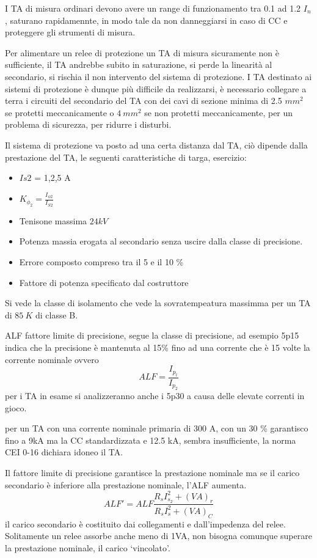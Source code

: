 I TA di misura ordinari devono avere un range di funzionamento tra 0.1 ad 1.2 $I_n$, saturano rapidamennte, in modo tale da non danneggiarsi in caso di CC e proteggere gli strumenti di misura.

Per alimentare un relee di protezione un TA di misura sicuramente non è sufficiente, il TA andrebbe subito in saturazione, si perde la linearità al secondario, si rischia il non intervento del sistema di protezione.
I TA destinato ai sistemi di protezione è dunque più difficile da realizzarsi, è necessario collegare a terra i circuiti del secondario del TA con dei cavi di sezione minima di 2.5 $mm^2$ se protetti meccanicamente o $4\ mm^2$ se non protetti meccanicamente, per un problema di sicurezza, per ridurre i disturbi.

Il sistema di protezione va posto ad una certa distanza dal TA, ciò dipende dalla prestazione del TA, le seguenti caratteristiche di targa, esercizio:
\begin{itemize}
    \item $Is2$ = 1,2,5 A
    \item $K_{\phi_2} = \frac{I_{\phi 2}}{I_{S2}}$
    \item Tenisone massima $24 kV$
    \item Potenza massia erogata al secondario senza uscire dalla classe di precisione.
    \item Errore composto compreso tra il 5 e il 10 \%
    \item Fattore di potenza specificato dal costruttore
\end{itemize}
Si vede la classe di isolamento che vede la sovratempeatura massimma per un TA di $ 85 \ K$ di classe B. 


ALF fattore limite di precisione, segue la classe di precisione, ad esempio 5p15 indica che la precisione è mantenuta al 15\% fino ad una corrente che è 15 volte la corrente nominale ovvero
$$
ALF = \frac{I_{p_l}}{I_{p_2}}
$$
per i TA in esame si analizzeranno anche i 5p30 a causa delle elevate correnti in gioco.

per un TA con una corrente nominale primaria di 300 A, con un 30 \% garantisco fino a 9kA ma la CC standardizzata e 12.5 kA, sembra insufficiente, la norma CEI 0-16 dichiara idoneo il TA.

Il fattore limite di precisione garantisce la prestazione nominale ma se il carico secondario è inferiore alla prestazione nominale, l'ALF aumenta.
$$
ALF' = ALF \frac{R_s I^2_{s_2} + (VA)_r}{R_s I^2_s + (VA)_C}
$$
il carico secondario è costituito dai collegamenti e dall'impedenza del relee.
Solitamente un relee assorbe anche meno di 1VA, non bisogna comunque superare la prestazione nominale, il carico `vincolato'.

